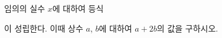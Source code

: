 임의의 실수 $x$에 대하여 등식\par\smallskip{}\par\smallskip\noindent 이 성립한다. 이때 상수 $a$, $b$에 대하여 $a+2b$의 값을 구하시오.
